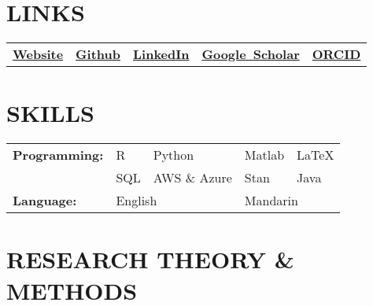 \documentclass[pdftex,11pt]{article}	%
\newif\ifacademia
\begin{document}

\printbibliography[heading=none, resetnumbers=true, keyword=present]

\section*{LINKS}
\begin{tabularx}{\textwidth}{@{} X  X  X  X  X @{}}
	 \mbox{\href{https://xycyuchenxu.github.io/YuchenXu/}{\bf{Website}}}  & \mbox{\href{https://github.com/XycYuchenXu}{\bf Github}} &
	\mbox{\href{https://www.linkedin.com/in/yuchenxu1015/}{\bf LinkedIn}} & \mbox{\href{https://scholar.google.com/citations?hl=en\&authuser=1\&user=Tx9EcgMAAAAJ}{\bf{Google Scholar}}} &
	\mbox{\href{https://orcid.org/0000-0003-1128-3774}{\bf{ORCID}}}
\end{tabularx}

\section*{SKILLS}
\begin{tabularx}{\textwidth}{@{} X X X X X @{}}
	{\bf Programming:} & R & Python & Matlab & \LaTeX \\
	& SQL & AWS \& Azure & Stan & Java\\
	{\bf Language:} & \multicolumn{2}{l}{English} & \multicolumn{2}{l}{Mandarin}
\end{tabularx}

\ifacademia
\else
\section*{RESEARCH THEORY \& METHODS}
\end{document}
